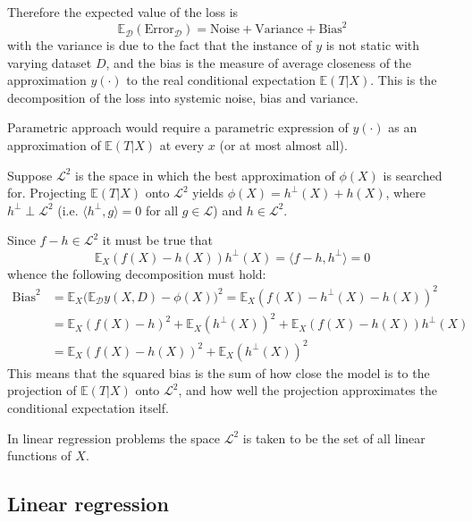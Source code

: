 \documentclass[a4paper]{article}
\newcommand{\Dcal}{\mathcal{D}}
\newcommand{\Lcal}{\mathcal{L}}
\newcommand{\Ex}[0]{{\mathbb{E}}}
\begin{document}
Therefore the expected value of the loss is 
\[\Ex_\Dcal(\text{Error}_\Dcal) = \text{Noise} + \text{Variance} + \text{Bias}^2\]
with the variance is due to the fact that the instance of $y$ is not static with
varying dataset $D$, and the bias is the measure of average closeness of the
approximation $y(\cdot)$ to the real conditional expectation $\Ex(T\rvert X)$.
This is the decomposition of the loss into systemic noise, bias and variance.


Parametric approach would require a parametric expression of $y(\cdot)$ as an
approximation of $\Ex(T\rvert X)$ at every $x$ (or at most almost all).

Suppose $\Lcal^2$ is the space in which the best approximation of $\phi(X)$ is searched for.
Projecting $\Ex(T\rvert X)$ onto $\Lcal^2$ yields $\phi(X) = h^\perp(X) + h(X)$, where
$h^\perp \perp \Lcal^2$ (i.e. $\langle h^\perp,g\rangle = 0$ for all $g\in \Lcal$) and $h\in \Lcal^2$.



Since $f-h\in\Lcal^2$ it must be true that
\[\Ex_X (f(X) - h(X)) h^\perp(X) = \langle f-h, h^\perp\rangle = 0 \]
whence the following decomposition must hold:
\begin{align*}
	\text{Bias}^2 &= \Ex_X \bigl( \Ex_\Dcal y(X,D) - \phi(X) \bigr)^2 
		= \Ex_X (f(X) - h^\perp(X) - h(X))^2 \\
		& = \Ex_X (f(X) - h)^2 + \Ex_X (h^\perp(X))^2 + \Ex_X (f(X) - h(X)) h^\perp(X) \\
		& = \Ex_X (f(X) - h(X))^2 + \Ex_X (h^\perp(X))^2
\end{align*}
This means that the squared bias is the sum of how close the model is to the projection of $\Ex(T\rvert X)$ onto $\Lcal^2$, and how well the projection approximates the conditional expectation itself.

In linear regression problems the space $\Lcal^2$ is taken to be the set of all linear functions of $X$.

\subsection*{Linear regression} %
\label{sub:linear_regression}
\end{document}
